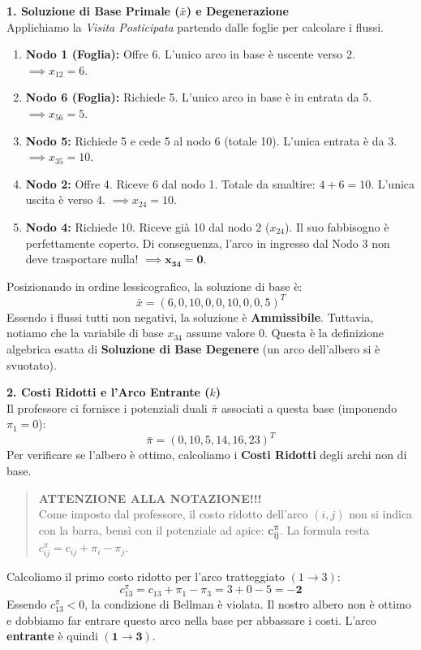 \documentclass[12pt, a4paper]{article}
\begin{document}
	\vspace{0.4cm}
	\textbf{1. Soluzione di Base Primale ($\bar{x}$) e Degenerazione}\\
	Applichiamo la \textit{Visita Posticipata} partendo dalle foglie per calcolare i flussi.
	\begin{enumerate}
		\item \textbf{Nodo 1 (Foglia):} Offre 6. L'unico arco in base è uscente verso 2. $\implies x_{12} = 6$.
		\item \textbf{Nodo 6 (Foglia):} Richiede 5. L'unico arco in base è in entrata da 5. $\implies x_{56} = 5$.
		\item \textbf{Nodo 5:} Richiede 5 e cede 5 al nodo 6 (totale 10). L'unica entrata è da 3. $\implies x_{35} = 10$.
		\item \textbf{Nodo 2:} Offre 4. Riceve 6 dal nodo 1. Totale da smaltire: $4+6 = 10$. L'unica uscita è verso 4. $\implies x_{24} = 10$.
		\item \textbf{Nodo 4:} Richiede 10. Riceve già 10 dal nodo 2 ($x_{24}$). Il suo fabbisogno è perfettamente coperto. Di conseguenza, l'arco in ingresso dal Nodo 3 non deve trasportare nulla! $\implies \mathbf{x_{34} = 0}$.
	\end{enumerate}
	
	Posizionando in ordine lessicografico, la soluzione di base è:
	\[ \bar{x} = (6, 0, 10, 0, 0, 10, 0, 0, 5)^T \]
	Essendo i flussi tutti non negativi, la soluzione è \textbf{Ammissibile}. Tuttavia, notiamo che la variabile di base $x_{34}$ assume valore $0$. Questa è la definizione algebrica esatta di \textbf{Soluzione di Base Degenere} (un arco dell'albero si è svuotato).
	
	\vspace{0.4cm}
	\textbf{2. Costi Ridotti e l'Arco Entrante ($k$)}\\
	Il professore ci fornisce i potenziali duali $\bar{\pi}$ associati a questa base (imponendo $\pi_1 = 0$):
	\[ \bar{\pi} = (0, 10, 5, 14, 16, 23)^T \]
	Per verificare se l'albero è ottimo, calcoliamo i \textbf{Costi Ridotti} degli archi non di base.
	\begin{quote}
		\textbf{ATTENZIONE ALLA NOTAZIONE!!!}\\
		Come imposto dal professore, il costo ridotto dell'arco $(i,j)$ non si indica con la barra, bensì con il potenziale ad apice: $\mathbf{c_{ij}^\pi}$. La formula resta $c_{ij}^\pi = c_{ij} + \pi_i - \pi_j$.
	\end{quote}
	
	Calcoliamo il primo costo ridotto per l'arco tratteggiato $(1\to3)$:
	\[ c_{13}^\pi = c_{13} + \pi_1 - \pi_3 = 3 + 0 - 5 = \mathbf{-2} \]
	Essendo $c_{13}^\pi < 0$, la condizione di Bellman è violata. Il nostro albero non è ottimo e dobbiamo far entrare questo arco nella base per abbassare i costi. L'arco \textbf{entrante} è quindi $\mathbf{(1\to3)}$.
	
\end{document}
